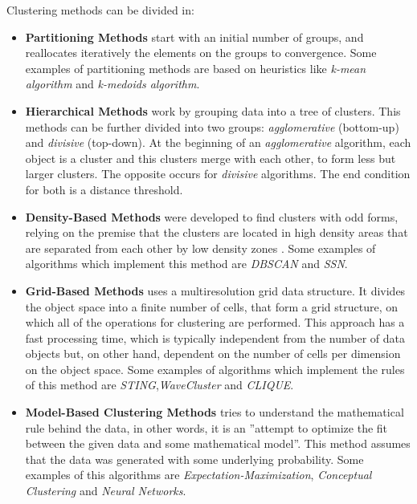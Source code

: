 Clustering methods can be divided in\cite{HanKam06}:
\begin{itemize}
\item \textbf{Partitioning Methods} start with an initial number of groups, and reallocates iteratively the elements on the groups
to convergence\cite{DBLP:journals/corr/abs-1205-1117}. Some examples of partitioning methods are based on heuristics like \emph{k-mean algorithm}
and \emph{k-medoids algorithm}.

\item \textbf{Hierarchical Methods} work by grouping data into a tree of clusters\cite{HanKam06}. This methods can be further divided into two
groups: \emph{agglomerative} (bottom-up) and \emph{divisive} (top-down)\cite{DBLP:journals/corr/abs-1205-1117}. At the beginning of an \emph{agglomerative} algorithm,
each object is a cluster and this clusters merge with each other, to form less but larger clusters. The opposite occurs for \emph{divisive} algorithms. The end 
condition for both is a distance threshold.\cite{HanKam06}

\item \textbf{Density-Based Methods} were developed to find clusters with odd forms, relying on the premise that the clusters are located in high density areas
that are separated from each other by low density zones \cite{HanKam06}. Some examples of algorithms which implement this method are \emph{DBSCAN} and \emph{SSN}.

\item \textbf{Grid-Based Methods} uses a multiresolution grid data structure. It divides the object space into a finite number of cells, that
form a grid structure, on which all of the operations for clustering are performed. This approach has a fast processing time,
which is typically independent from the number of data objects but, on other hand, dependent on the number of cells per dimension on the object space\cite{HanKam06}.
Some examples of algorithms which implement the rules of this method are \emph{STING},\emph{WaveCluster} and \emph{CLIQUE}.

\item \textbf{Model-Based Clustering Methods} tries to understand the mathematical rule behind the data, in other words, it is an
''attempt to optimize the fit between the given data and some mathematical model''\cite[p. 429]{HanKam06}. This method assumes 
that the data was generated with some underlying probability. Some examples of this algorithms are \emph{Expectation-Maximization},
\emph{Conceptual Clustering} and \emph{Neural Networks}.

\end{itemize}

